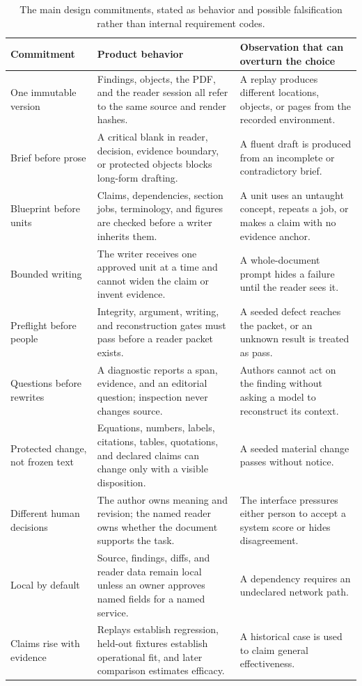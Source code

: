 \begin{table}[H]
\centering
\small
\begin{tabularx}{\textwidth}{@{}p{}L p{0.23\textwidth}@{}}
\toprule
Commitment & Product behavior & Observation that can overturn the choice \\
\midrule
One immutable version & Findings, objects, the PDF, and the reader session all
refer to the same source and render hashes. & A replay produces different
locations, objects, or pages from the recorded environment. \\
Brief before prose & A critical blank in reader, decision, evidence boundary,
or protected objects blocks long-form drafting. & A fluent draft is produced
from an incomplete or contradictory brief. \\
Blueprint before units & Claims, dependencies, section jobs, terminology, and
figures are checked before a writer inherits them. & A unit uses an untaught
concept, repeats a job, or makes a claim with no evidence anchor. \\
Bounded writing & The writer receives one approved unit at a time and cannot
widen the claim or invent evidence. & A whole-document prompt hides a failure
until the reader sees it. \\
Preflight before people & Integrity, argument, writing, and reconstruction gates
must pass before a reader packet exists. & A seeded defect reaches the packet,
or an unknown result is treated as pass. \\
Questions before rewrites & A diagnostic reports a span, evidence, and an
editorial question; inspection never changes source. & Authors cannot act on the
finding without asking a model to reconstruct its context. \\
Protected change, not frozen text & Equations, numbers, labels, citations,
tables, quotations, and declared claims can change only with a visible
disposition. & A seeded material change passes without notice. \\
Different human decisions & The author owns meaning and revision; the named
reader owns whether the document supports the task. & The interface pressures
either person to accept a system score or hides disagreement. \\
Local by default & Source, findings, diffs, and reader data remain local unless
an owner approves named fields for a named service. & A dependency requires an
undeclared network path. \\
Claims rise with evidence & Replays establish regression, held-out fixtures
establish operational fit, and later comparison estimates efficacy. & A
historical case is used to claim general effectiveness. \\
\bottomrule
\end{tabularx}
\caption{The main design commitments, stated as behavior and possible
falsification rather than internal requirement codes.}
\label{tab:requirements}
\end{table}

